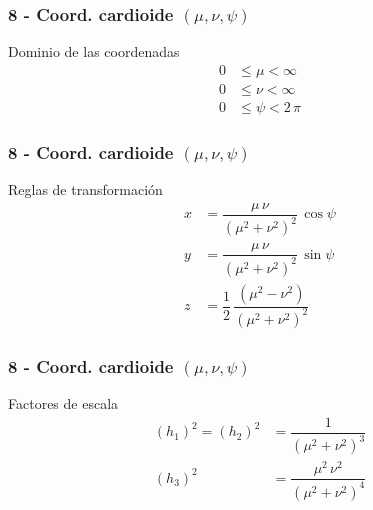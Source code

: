 \documentclass[12pt]{beamer}
\begin{document}
\begin{frame}
\frametitle{8 - Coord. cardioide $(\mu, \nu, \psi)$}
\fontsize{12}{12}\selectfont
Dominio de las coordenadas
\begin{align*}
0 &\leq \mu < \infty \\
0 &\leq \nu < \infty \\
0 &\leq \psi < 2 \, \pi
\end{align*}
\end{frame}
\begin{frame}
\frametitle{8 - Coord. cardioide $(\mu, \nu, \psi)$}
\fontsize{12}{12}\selectfont
Reglas de transformación
\begin{align*}
x &= \dfrac{\mu \, \nu}{(\mu^{2} + \nu^{2})^{2}} \, \cos \psi \\[0.5em]
y &= \dfrac{\mu \, \nu}{(\mu^{2} + \nu^{2})^{2}} \, \sin \psi \\[0.5em]
z &= \dfrac{1}{2} \, \dfrac{(\mu^{2} - \nu^{2})}{(\mu^{2} + \nu^{2})^{2}}
\end{align*}
\end{frame}
\begin{frame}
\frametitle{8 - Coord. cardioide $(\mu, \nu, \psi)$}
\fontsize{12}{12}\selectfont
Factores de escala
\begin{align*}
(h_{1})^{2} = (h_{2})^{2} &= \dfrac{1}{(\mu^{2} + \nu^{2})^{3}} \\[0.5em]
(h_{3})^{2} &= \dfrac{\mu^{2} \, \nu^{2}}{(\mu^{2} + \nu^{2})^{4}}
\end{align*}
\end{frame}
\end{document}
